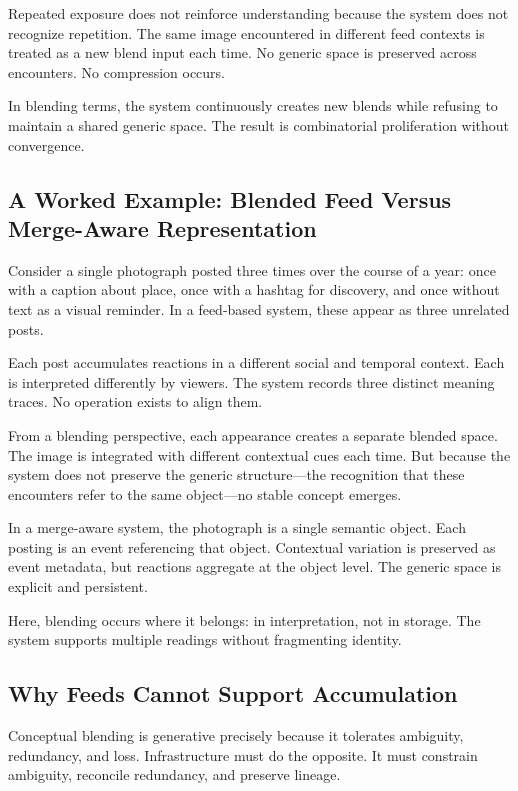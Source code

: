 \documentclass[11pt,oneside]{article}
\begin{document}
Repeated exposure does not reinforce understanding because the system does not recognize repetition. The same image encountered in different feed contexts is treated as a new blend input each time. No generic space is preserved across encounters. No compression occurs.

In blending terms, the system continuously creates new blends while refusing to maintain a shared generic space. The result is combinatorial proliferation without convergence.

\subsection{A Worked Example: Blended Feed Versus Merge-Aware Representation}

Consider a single photograph posted three times over the course of a year: once with a caption about place, once with a hashtag for discovery, and once without text as a visual reminder. In a feed-based system, these appear as three unrelated posts.

Each post accumulates reactions in a different social and temporal context. Each is interpreted differently by viewers. The system records three distinct meaning traces. No operation exists to align them.

From a blending perspective, each appearance creates a separate blended space. The image is integrated with different contextual cues each time. But because the system does not preserve the generic structure—the recognition that these encounters refer to the same object—no stable concept emerges.

In a merge-aware system, the photograph is a single semantic object. Each posting is an event referencing that object. Contextual variation is preserved as event metadata, but reactions aggregate at the object level. The generic space is explicit and persistent.

Here, blending occurs where it belongs: in interpretation, not in storage. The system supports multiple readings without fragmenting identity.

\subsection{Why Feeds Cannot Support Accumulation}

Conceptual blending is generative precisely because it tolerates ambiguity, redundancy, and loss. Infrastructure must do the opposite. It must constrain ambiguity, reconcile redundancy, and preserve lineage.
\end{document}
